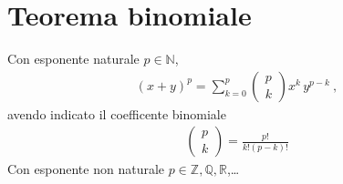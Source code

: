 \documentclass[letterpaper,10pt,italian]{jupyterBook}
\begin{document}
\section{Teorema binomiale}
\label{\detokenize{ch/precalculus/polynomials:teorema-binomiale}}\label{\detokenize{ch/precalculus/polynomials:math-hs-precalculus-polynomials-binomial-thm}}
\sphinxAtStartPar
Con esponente naturale \(p \in \mathbb{N}\),
\begin{equation*}
\begin{split}\left( x + y \right)^p = \sum_{k=0}^{p} \left( \begin{matrix} p \\ k \end{matrix} \right) x^k \, y^{p-k} \ ,\end{split}
\end{equation*}
\sphinxAtStartPar
avendo indicato il coefficente binomiale
\begin{equation*}
\begin{split}\left( \begin{matrix} p \\ k \end{matrix} \right) = \frac{p!}{k! (p-k)!}\end{split}
\end{equation*}
\sphinxAtStartPar
Con esponente non naturale \(p \in \mathbb{Z}, \mathbb{Q}, \mathbb{R}\),… 

\sphinxstepscope
\end{document}
